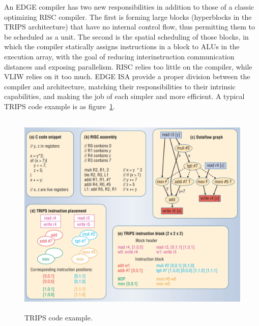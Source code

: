 \documentclass[UTF8,12pt,a4paper]{article}
\begin{document}
An EDGE compiler has two new responsibilities in addition to those of a classic optimizing RISC compiler.
The first is forming large blocks (hyperblocks in the TRIPS architecture) that have no internal control flow,
thus permitting them to be scheduled as a unit.
The second is the spatial scheduling of those blocks,
in which the compiler statically assigns instructions in a block to ALUs in the execution array,
with the goal of reducing interinstruction communication distances and exposing parallelism.
RISC relies too little on the compiler, while VLIW relies on it too much. 
EDGE ISA provide a proper division between the compiler and architecture,
matching their responsibilities to their intrinsic capabilities,
and making the job of each simpler and more efficient.
A typical TRIPS code example is as figure~\ref{fig:trips_code}.

\begin{figure}[htb]
  \begin{small}
    \begin{center}
      \includegraphics[width=\textwidth,height=10cm]{figures/ieee_computer_trips_code.png}
    \end{center}
    \caption{TRIPS code example.}
    \label{fig:trips_code}
  \end{small}
\end{figure}
\end{document}
